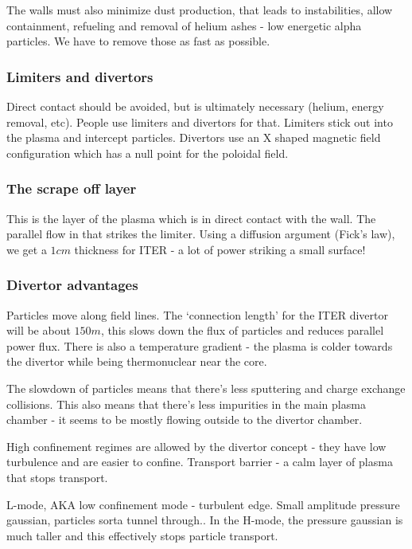 \documentclass[PlasmaNotes.tex]{subfiles}
\begin{document}
The walls must also minimize dust production, that leads to instabilities, allow containment, refueling and removal of helium ashes - low energetic alpha particles. We have to remove those as fast as possible.

\subsubsection{Limiters and divertors}

Direct contact should be avoided, but is ultimately necessary (helium, energy removal, etc). People use limiters and divertors for that. Limiters stick out into the plasma and intercept particles. Divertors use an X shaped magnetic field configuration which has a null point for the poloidal field.

\subsubsection{The scrape off layer}

This is the layer of the plasma which is in direct contact with the wall. The parallel flow in that strikes the limiter. Using a diffusion argument (Fick's law), we get a $1cm$ thickness for ITER - a lot of power striking a small surface! 

\subsubsection{Divertor advantages}

Particles move along field lines. The `connection length' for the ITER divertor will be about $150m$, this slows down the flux of particles and reduces parallel power flux. There is also a temperature gradient - the plasma is colder towards the divertor while being thermonuclear near the core.

The slowdown of particles means that there's less sputtering and charge exchange collisions. This also means that there's less impurities in the main plasma chamber - it seems to be mostly flowing outside to the divertor chamber.

High confinement regimes are allowed by the divertor concept - they have low turbulence and are easier to confine. Transport barrier - a calm layer of plasma that stops transport.

L-mode, AKA low confinement mode - turbulent edge. Small amplitude pressure gaussian, particles sorta tunnel through.. In the H-mode, the pressure gaussian is much taller and this effectively stops particle transport.
\end{document}
